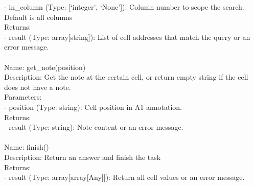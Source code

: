 \begin{tcolorbox}[breakable,title=Prompt Details for Sheet]
- in\_column (Type: [`integer', `None']): Column number to scope the search. Default is all columns\\
Returns:\\
- result (Type: array[string]): List of cell addresses that match the query or an error message.\\
\\
Name: get\_note(position)\\
Description: Get the note at the certain cell, or return empty string if the cell does not have a note.\\
Parameters:\\
- position (Type: string): Cell position in A1 annotation.\\
Returns:\\
- result (Type: string): Note content or an error message.\\
\\
Name: finish()\\
Description: Return an answer and finish the task\\
Returns:\\
- result (Type: array[array[Any]]): Return all cell values or an error message.\\



\end{tcolorbox}
